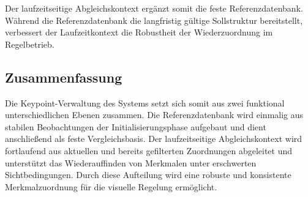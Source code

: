 Der laufzeitseitige Abgleichskontext ergänzt somit die feste Referenzdatenbank. Während die Referenzdatenbank die langfristig gültige Sollstruktur bereitstellt, verbessert der Laufzeitkontext die Robustheit der Wiederzuordnung im Regelbetrieb.

\newpage
\subsection{Zusammenfassung}
\label{subsec:zusammenfassung_keypoint_datenbank}

Die Keypoint-Verwaltung des Systems setzt sich somit aus zwei funktional unterschiedlichen Ebenen zusammen. Die Referenzdatenbank wird einmalig aus stabilen Beobachtungen der Initialisierungsphase aufgebaut und dient anschließend als feste Vergleichsbasis. Der laufzeitseitige Abgleichskontext wird fortlaufend aus aktuellen und bereits gefilterten Zuordnungen abgeleitet und unterstützt das Wiederauffinden von Merkmalen unter erschwerten Sichtbedingungen. Durch diese Aufteilung wird eine robuste und konsistente Merkmalzuordnung für die visuelle Regelung ermöglicht.
